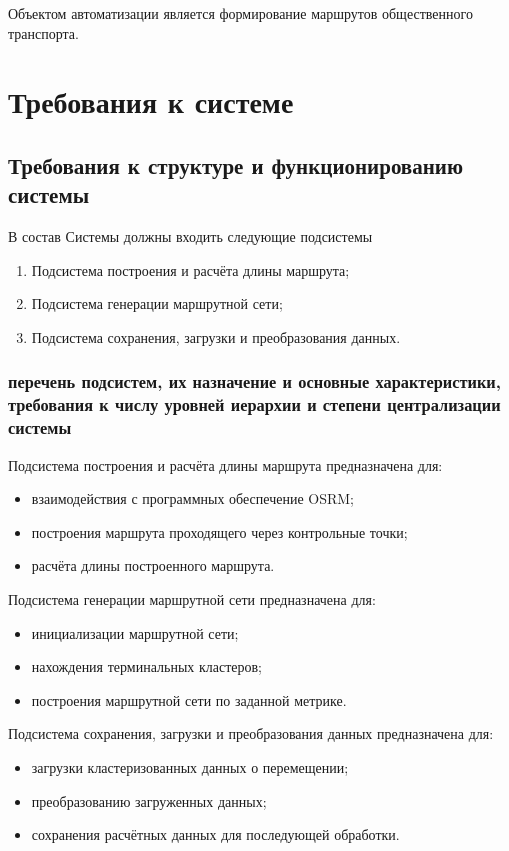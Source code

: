 Объектом автоматизации является формирование маршрутов общественного транспорта.

\chapter{Требования к системе}
\section{Требования к структуре и функционированию системы}
В состав Системы должны входить следующие подсистемы
\begin{enumerate}
    \item Подсистема построения и расчёта длины маршрута;
    \item Подсистема генерации маршрутной сети;
    \item Подсистема сохранения, загрузки и преобразования данных.
\end{enumerate}

\subsection{перечень подсистем, их назначение и основные характеристики, требования к числу уровней 
    иерархии и степени централизации системы}
Подсистема построения и расчёта длины маршрута предназначена для:
\begin{itemize}
    \item взаимодействия с программных обеспечение OSRM;
    \item построения маршрута проходящего через контрольные точки;
    \item расчёта длины построенного маршрута.
\end{itemize}

Подсистема генерации маршрутной сети предназначена для:
\begin{itemize}
    \item инициализации маршрутной сети;
    \item нахождения терминальных кластеров;
    \item построения маршрутной сети по заданной метрике.
\end{itemize}

Подсистема сохранения, загрузки и преобразования данных предназначена для:
\begin{itemize}
    \item загрузки кластеризованных данных о перемещении;
    \item преобразованию загруженных данных;
    \item сохранения расчётных данных для последующей обработки.
\end{itemize}

